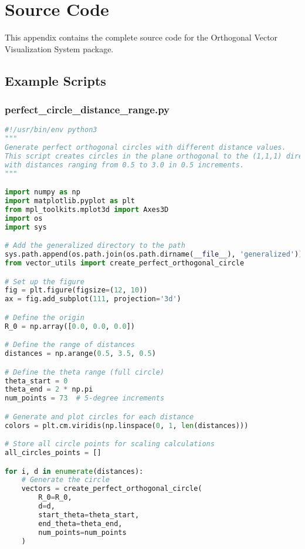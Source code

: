 
\newpage
\section{Source Code}

This appendix contains the complete source code for the Orthogonal Vector Visualization System package.

\subsection{Example Scripts}

\subsubsection{perfect\_circle\_distance\_range.py}

\begin{lstlisting}[language=Python]
#!/usr/bin/env python3
"""
Generate perfect orthogonal circles with different distance values.
This script creates circles in the plane orthogonal to the (1,1,1) direction
with distances ranging from 0.5 to 3.0 in 0.5 increments.
"""

import numpy as np
import matplotlib.pyplot as plt
from mpl_toolkits.mplot3d import Axes3D
import os
import sys

# Add the generalized directory to the path
sys.path.append(os.path.join(os.path.dirname(__file__), 'generalized'))
from vector_utils import create_perfect_orthogonal_circle

# Set up the figure
fig = plt.figure(figsize=(12, 10))
ax = fig.add_subplot(111, projection='3d')

# Define the origin
R_0 = np.array([0.0, 0.0, 0.0])

# Define the range of distances
distances = np.arange(0.5, 3.5, 0.5)

# Define the theta range (full circle)
theta_start = 0
theta_end = 2 * np.pi
num_points = 73  # 5-degree increments

# Generate and plot circles for each distance
colors = plt.cm.viridis(np.linspace(0, 1, len(distances)))

# Store all circle points for scaling calculations
all_circles_points = []

for i, d in enumerate(distances):
    # Generate the circle
    vectors = create_perfect_orthogonal_circle(
        R_0=R_0,
        d=d,
        start_theta=theta_start,
        end_theta=theta_end,
        num_points=num_points
    )
    

\end{lstlisting}
